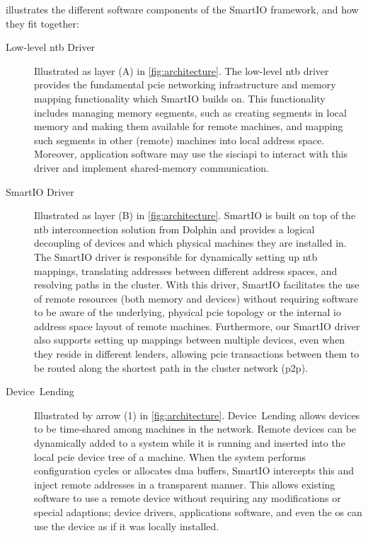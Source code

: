  illustrates the different software components of the SmartIO framework, and how they fit together:
\begin{description}
    \item[Low-level \gls{ntb} Driver] Illustrated as layer {\textsf{(A)}} in \cref{fig:architecture}.
        The low-level \gls{ntb} driver provides the fundamental \gls{pcie} networking infrastructure and memory mapping functionality which SmartIO builds on.
        This functionality includes managing memory segments, such as creating segments in local memory and making them available for remote machines, and mapping such segments in other (remote) machines into local address space.
        Moreover, application software may use the \gls{sisciapi} to interact with this driver and implement shared-memory communication.

    \item[SmartIO Driver] Illustrated as layer {\textsf{(B)}} in \cref{fig:architecture}.
        SmartIO is built on top of the \gls{ntb} interconnection solution from Dolphin and provides a logical decoupling of devices and which physical machines they are installed in.
        The SmartIO driver is responsible for dynamically setting up \gls{ntb} mappings, translating addresses between different address spaces, and resolving paths in the cluster.
        With this driver, SmartIO facilitates the use of remote resources (both memory and devices) without requiring software to be aware of the underlying, physical \gls{pcie} topology or the internal \gls{io} address space layout of remote machines.
        Furthermore, our SmartIO driver also supports setting up mappings between multiple devices, even when they reside in different \glspl{lender}, allowing \gls{pcie} transactions between them to be routed along the shortest path in the cluster network (\gls{p2p}).

    \item[Device~Lending] Illustrated by arrow {\textsf{(1)}} in \cref{fig:architecture}.
        Device~Lending allows devices to be time-shared among machines in the network.
        Remote devices can be dynamically added to a system while it is running and inserted into the local \gls{pcie} device tree of a machine.
        When the system performs configuration cycles or allocates \gls{dma} buffers, SmartIO intercepts this and inject remote addresses in a transparent manner.
        This allows existing software to use a remote device without requiring any modifications or special adaptions;
        device drivers, applications software, and even the \gls{os} can use the device as if it was locally installed.


\end{description}

